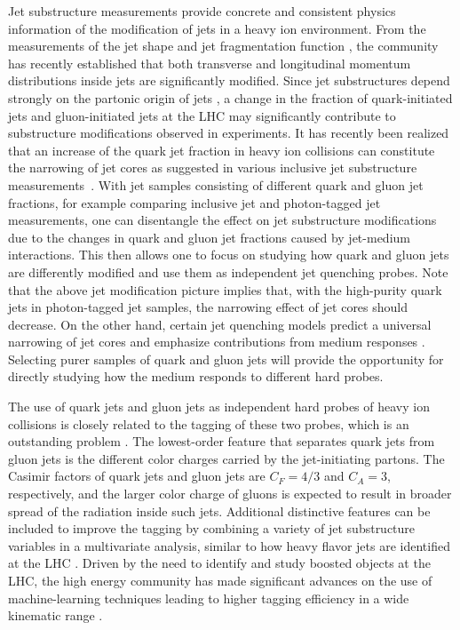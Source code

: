 \documentclass[notoc,preprintnumbers]{JHEP3}
\begin{document}
Jet substructure measurements provide concrete and consistent physics information of the modification of jets in a heavy ion environment. From the measurements of the jet shape \cite{Ellis:1992qq,Chatrchyan:2013kwa,Khachatryan:2016tfj,Seymour:1997kj,Li:2011hy,Li:2012bw,Vitev:2008rz,Vitev:2009rd} and jet fragmentation function \cite{Procura:2009vm,Chatrchyan:2012gw,Aad:2014wha,Chatrchyan:2014ava,Aaboud:2017bzv,Sirunyan:2018qec}, the community has recently established that both transverse and longitudinal momentum distributions inside jets are significantly modified. Since jet substructures depend strongly on the partonic origin of jets \cite{Gallicchio:2011xq,Gallicchio:2012ez,Chien:2012ur,Chien:2015ctp,Chien:2014nsa}, a change in the fraction of quark-initiated jets and gluon-initiated jets at the LHC may significantly contribute to substructure modifications observed in experiments. It has recently been realized that an increase of the quark jet fraction in heavy ion collisions can constitute the narrowing of jet cores as suggested in various inclusive jet substructure measurements~\cite{Chien:2015hda,Spousta:2015fca}. With jet samples consisting of different quark and gluon jet fractions, for example comparing inclusive jet and photon-tagged jet measurements, one can disentangle the effect on jet substructure modifications due to the changes in quark and gluon jet fractions caused by jet-medium interactions. This then allows one to focus on studying how quark and gluon jets are differently modified and use them as independent jet quenching probes. Note that the above jet modification picture implies that, with the high-purity quark jets in photon-tagged jet samples, the narrowing effect of jet cores should decrease. On the other hand, certain jet quenching models predict a universal narrowing of jet cores \cite{KunnawalkamElayavalli:2017hxo,Milhano:2017nzm,Casalderrey-Solana:2016jvj,Brewer:2017fqy} and emphasize contributions from medium responses \cite{Tachibana:2017syd}. Selecting purer samples of quark and gluon jets will provide the opportunity for directly studying how the medium responds to different hard probes.

The use of quark jets and gluon jets as independent hard probes of heavy ion collisions is closely related to the tagging of these two probes, which is an outstanding problem \cite{Gras:2017jty,Frye:2017yrw}. The lowest-order feature that separates quark jets from gluon jets is the different color charges carried by the jet-initiating partons. The Casimir factors of quark jets and gluon jets are $C_F = 4/3$ and $C_A=3$, respectively, and the larger color charge of gluons is expected to result in broader spread of the radiation inside such jets. Additional distinctive features can be included to improve the tagging by combining a variety of jet substructure variables in a multivariate analysis, similar to how heavy flavor jets are identified at the LHC \cite{Chatrchyan:2012jua, Aad:2015ydr}. Driven by the need to identify and study boosted objects at the LHC, the high energy community has made significant advances on the use of machine-learning techniques leading to higher tagging efficiency in a wide kinematic range \cite{Komiske:2016rsd, Larkoski:2017jix}.
\end{document}
